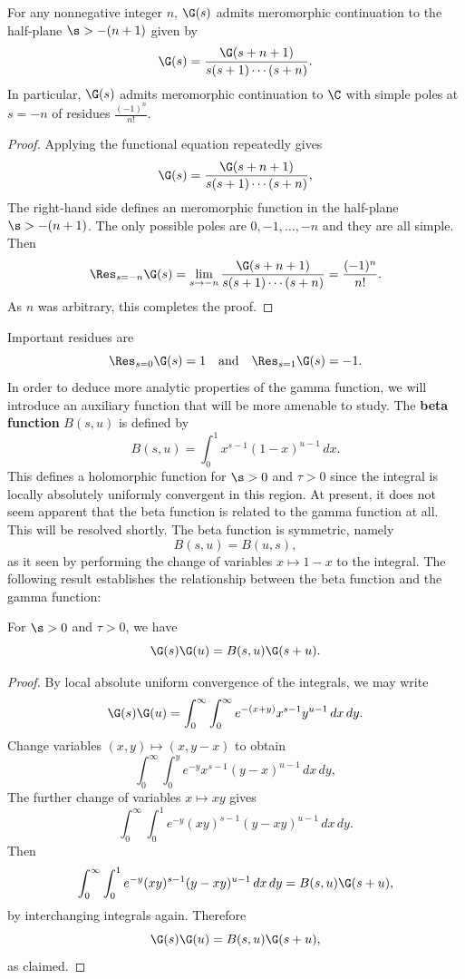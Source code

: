   \begin{theorem}\label{thm:continuation_of_gamma_function}
    For any nonnegative integer \(n\), \(\G(s)\) admits meromorphic continuation to the half-plane \(\s > -(n+1)\) given by
    \[
      \G(s) = \frac{\G(s+n+1)}{s(s+1) \cdots (s+n)}.
    \]
    In particular, \(\G(s)\) admits meromorphic continuation to \(\C\) with simple poles at \(s = -n\) of residues \(\frac{(-1)^{n}}{n!}\).
  \end{theorem}
  \begin{proof}
    Applying the functional equation repeatedly gives
    \[
      \G(s) = \frac{\G(s+n+1)}{s(s+1) \cdots (s+n)},
    \]
    The right-hand side defines an meromorphic function in the half-plane \(\s > -(n+1)\). The only possible poles are \(0,-1,\ldots,-n\) and they are all simple. Then
    \[
      \Res_{s = -n}\G(s) = \lim_{s \to -n}\frac{\G(s+n+1)}{s(s+1) \cdots (s+n)} = \frac{(-1)^{n}}{n!}. 
    \]
    As \(n\) was arbitrary, this completes the proof.
  \end{proof}

  Important residues are
  \[
    \Res_{s = 0}\G(s) = 1 \quad \text{and} \quad \Res_{s = 1}\G(s) = -1.
  \]
  In order to deduce more analytic properties of the gamma function, we will introduce an auxiliary function that will be more amenable to study. The \textbf{beta function} \(B(s,u)\) is defined by
  \[
      B(s,u) = \int_{0}^{1}x^{s-1}(1-x)^{u-1}\,dx.
  \]
  This defines a holomorphic function for \(\s > 0\) and \(\tau > 0\) since the integral is locally absolutely uniformly convergent in this region. At present, it does not seem apparent that the beta function is related to the gamma function at all. This will be resolved shortly. The beta function is symmetric, namely
  \[
      B(s,u) = B(u,s),
  \]
  as it seen by performing the change of variables \(x \mapsto 1-x\) to the integral. The following result establishes the relationship between the beta function and the gamma function:

  \begin{proposition}\label{prop:integral_reprepsentation_for_beta_function}
    For \(\s > 0\) and \(\tau > 0\), we have
    \[
      \G(s)\G(u) = B(s,u)\G(s+u).
    \]
  \end{proposition}
  \begin{proof}
    By local absolute uniform convergence of the integrals, we may write
    \[
      \G(s)\G(u) = \int_{0}^{\infty}\int_{0}^{\infty}e^{-(x+y)}x^{s-1}y^{u-1}\,dx\,dy.
    \]
    Change variables \((x,y) \mapsto (x,y-x)\) to obtain
    \[
      \int_{0}^{\infty}\int_{0}^{y}e^{-y}x^{s-1}(y-x)^{u-1}\,dx\,dy,
    \]
    The further change of variables \(x \mapsto xy\) gives
    \[
      \int_{0}^{\infty}\int_{0}^{1}e^{-y}(xy)^{s-1}(y-xy)^{u-1}\,dx\,dy.
    \]
    Then
    \[
      \int_{0}^{\infty}\int_{0}^{1}e^{-y}(xy)^{s-1}(y-xy)^{u-1}\,dx\,dy = B(s,u)\G(s+u),
    \]
    by interchanging integrals again. Therefore
    \[
      \G(s)\G(u) = B(s,u)\G(s+u),
    \]
    as claimed.
  \end{proof}

